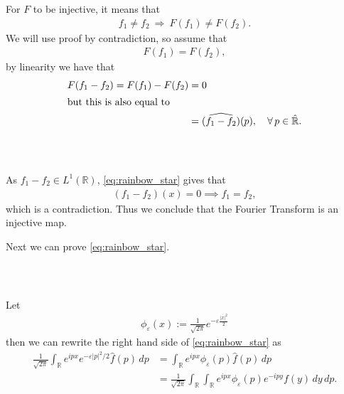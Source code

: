\documentclass{beamer}
\numberwithin{equation}{section}
\begin{document}
\begin{frame}\frametitle{{\normalsize \secname} \\ {\large \subsecname}}
    For $F$ to be injective, it means that
    \begin{align}
        f_1 \neq f_2 \ \Rightarrow \ F(f_1) \neq F(f_2).
    \end{align}
    We will use proof by contradiction, so assume that
    \begin{align}
        F(f_1) = F(f_2),
    \end{align}
    by linearity we have that
    \begin{align}
        F(f_1 - f_2) = F(f_1) - F(f_2) &= 0 \\
        \intertext{but this is also equal to}
        &= \widehat{(f_1 - f_2)}(p), \quad \forall \, p \in \hat{\mathbb{R}}.
    \end{align}
\end{frame}

\begin{frame}\frametitle{{\normalsize \secname} \\ {\large \subsecname}}
    As $f_1 - f_2 \in L^1(\mathbb{R})$, \eqref{eq:rainbow_star} gives that
    \begin{align}
        (f_1 - f_2)(x) = 0 \implies f_1 = f_2,
    \end{align}
    which is a contradiction.
    Thus we conclude that the Fourier Transform is an injective map.
    \vspace{1em}

    Next we can prove \eqref{eq:rainbow_star}.
\end{frame}

\begin{frame}\frametitle{{\normalsize \secname} \\ {\large \subsecname}}
    Let 
    \begin{align}
        \phi_\varepsilon(x) := \frac{1}{\sqrt{2 \pi}} e^{-\varepsilon \frac{|x|^2}{2}}
    \end{align}
    then we can rewrite the right hand side of \eqref{eq:rainbow_star} as
    \begin{align}
        \frac{1}{\sqrt{2 \pi}} \int_\mathbb{R} e^{ipx}e^{- \varepsilon |p|^2/2} \hat{f}(p) \, dp &= \int_\mathbb{R} e^{ipx} \phi_\varepsilon(p) \hat{f}(p) \, dp \\
        &= \frac{1}{\sqrt{2 \pi}} \int_\mathbb{R} \int_\mathbb{R} e^{ipx}  \phi_\varepsilon(p) e^{-ipy} f(y) \, dy \, dp.
    \end{align}
\end{frame}
\end{document}
